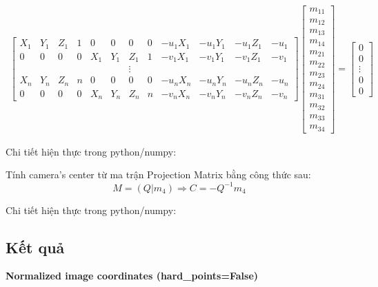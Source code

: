 \documentclass[11pt]{article}
\begin{document}
\begin{align*}
    \begin{bmatrix}
        X_1 & Y_1 & Z_1 & 1 & 0 & 0 & 0 & 0 & -u_1X_1 & -u_1Y_1 & -u_1Z_1 & -u_1\\
        0 & 0 & 0 & 0 & X_1 & Y_1 & Z_1 & 1 & -v_1X_1 & -v_1Y_1 & -v_1Z_1 & -v_1\\
         &  &  &  &  &  & \vdots &  &  &  &  & \\
        X_n & Y_n & Z_n & n & 0 & 0 & 0 & 0 & -u_nX_n & -u_nY_n & -u_nZ_n & -u_n\\
        0 & 0 & 0 & 0 & X_n & Y_n & Z_n & n & -v_nX_n & -v_nY_n & -v_nZ_n & -v_n
    \end{bmatrix}
    \begin{bmatrix}
        m_{11} \\
        m_{12} \\
        m_{13} \\
        m_{14} \\
        m_{21} \\
        m_{22} \\
        m_{23} \\
        m_{24} \\
        m_{31} \\
        m_{32} \\
        m_{33} \\
        m_{34}
    \end{bmatrix}
    = 
    \begin{bmatrix}
        0 \\
        0 \\
        \vdots \\
        0 \\
        0 
    \end{bmatrix}
\end{align*}

Chi tiết hiện thực trong python/numpy:

Tính camera's center từ ma trận Projection Matrix bằng công thức sau:
\begin{equation*}
    M=(Q|m_4) \Rightarrow C = - Q^{-1}m_4
\end{equation*}

Chi tiết hiện thực trong python/numpy:


\subsection*{Kết quả}
\textbf{Normalized image coordinates (hard\_points=False)}
\end{document}
